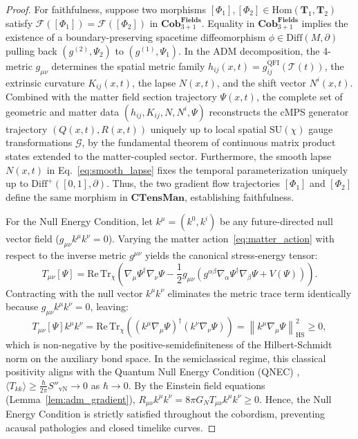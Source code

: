 \documentclass[11pt,a4paper,reqno]{amsart}
\theoremstyle{definition}
\numberwithin{equation}{section}
\newcommand{\CTens}{\mathbf{CTensMan}}
\newcommand{\Cob}{\mathbf{Cob}_{3+1}^{\mathbf{Fields}}}
\newcommand{\Tr}{\mathrm{Tr}}
\newcommand{\QFI}{\mathrm{QFI}}
\begin{document}
\begin{proof}
For faithfulness, suppose two morphisms $[\Phi_1], [\Phi_2] \in \mathrm{Hom}(\mathbf{T}_1, \mathbf{T}_2)$ satisfy $\mathcal{F}([\Phi_1]) = \mathcal{F}([\Phi_2])$ in $\Cob$. Equality in $\Cob$ implies the existence of a boundary-preserving spacetime diffeomorphism $\phi \in \mathrm{Diff}(M, \partial)$ pulling back $(g^{(2)}, \Psi_2)$ to $(g^{(1)}, \Psi_1)$. In the ADM decomposition, the 4-metric $g_{\mu\nu}$ determines the spatial metric family $h_{ij}(x, t) = g^{\QFI}_{ij}(\mathcal{T}(t))$, the extrinsic curvature $K_{ij}(x, t)$, the lapse $N(x, t)$, and the shift vector $N^i(x, t)$. Combined with the matter field section trajectory $\Psi(x, t)$, the complete set of geometric and matter data $(h_{ij}, K_{ij}, N, N^i, \Psi)$ reconstructs the cMPS generator trajectory $(Q(x, t), R(x, t))$ uniquely up to local spatial $\mathrm{SU}(\chi)$ gauge transformations $\mathcal{G}$, by the fundamental theorem of continuous matrix product states \cite{verstraete2010continuous} extended to the matter-coupled sector. Furthermore, the smooth lapse $N(x, t)$ in Eq.~\eqref{eq:smooth_lapse} fixes the temporal parameterization uniquely up to $\mathrm{Diff}^+([0, 1], \partial)$. Thus, the two gradient flow trajectories $[\Phi_1]$ and $[\Phi_2]$ define the same morphism in $\CTens$, establishing faithfulness.

For the Null Energy Condition, let $k^\mu = (k^0, k^i)$ be any future-directed null vector field ($g_{\mu\nu} k^\mu k^\nu = 0$). Varying the matter action~\eqref{eq:matter_action} with respect to the inverse metric $g^{\mu\nu}$ yields the canonical stress-energy tensor:
\begin{equation}
    T_{\mu\nu}[\Psi] = \mathrm{Re} \, \Tr_\chi \left( \nabla_\mu \Psi^\dagger \nabla_\nu \Psi - \frac{1}{2} g_{\mu\nu} \left( g^{\alpha\beta} \nabla_\alpha \Psi^\dagger \nabla_\beta \Psi + V(\Psi) \right) \right).
\end{equation}
Contracting with the null vector $k^\mu k^\nu$ eliminates the metric trace term identically because $g_{\mu\nu} k^\mu k^\nu = 0$, leaving:
\begin{equation}
    T_{\mu\nu}[\Psi] k^\mu k^\nu = \mathrm{Re} \, \Tr_\chi \left( (k^\mu \nabla_\mu \Psi)^\dagger (k^\nu \nabla_\nu \Psi) \right) = \left\| k^\mu \nabla_\mu \Psi \right\|_{\mathrm{HS}}^2 \ge 0,
\end{equation}
which is non-negative by the positive-semidefiniteness of the Hilbert-Schmidt norm on the auxiliary bond space. In the semiclassical regime, this classical positivity aligns with the Quantum Null Energy Condition (QNEC) \cite{bousso2016}, $\langle T_{kk} \rangle \ge \frac{\hbar}{2\pi} S''_{\mathrm{vN}} \to 0$ as $\hbar \to 0$. By the Einstein field equations (Lemma~\ref{lem:adm_gradient}), $R_{\mu\nu} k^\mu k^\nu = 8\pi G_N T_{\mu\nu} k^\mu k^\nu \ge 0$. Hence, the Null Energy Condition is strictly satisfied throughout the cobordism, preventing acausal pathologies and closed timelike curves.
\end{proof}
\end{document}
